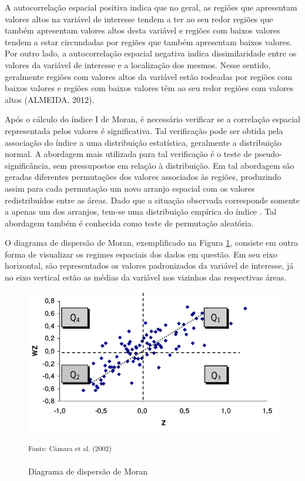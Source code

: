 \documentclass[12pt, a4paper,brazil,oneside]{article}
\begin{document}
	A autocorrelação espacial positiva indica que no geral, as regiões que apresentam valores altos na variável de interesse tendem a ter ao seu redor regiões que também apresentam valores altos desta variável e regiões com baixos valores tendem a estar circundadas por regiões que também apresentam baixos valores. Por outro lado, a autocorrelação espacial negativa indica dissimilaridade entre os valores da variável de interesse e a localização dos mesmos. Nesse sentido, geralmente regiões com valores altos da variável estão rodeadas por regiões com baixos valores e regiões com baixos valores têm ao seu redor regiões com valores altos (ALMEIDA, 2012).
	
	Após o cálculo do índice I de Moran, é necessário verificar se a correlação espacial representada pelos valores é significativa. Tal verificação pode ser obtida pela associação do índice a uma distribuição estatística, geralmente  a distribuição normal. A abordagem mais utilizada para tal verificação é o teste de pseudo-significância, sem pressupostos em relação à distribuição. Em tal abordagem são geradas diferentes permutações dos valores associados às regiões, produzindo assim para cada permutação um novo arranjo espacial com os valores redistribuídos entre as áreas. Dado que a situação observada corresponde somente a apenas um dos arranjos, tem-se uma distribuição empírica do índice \cite{camara04}. Tal abordagem também é conhecida como teste de permutação aleatória.
	
	O diagrama de dispersão de Moran, exemplificado na Figura \ref{dispersaomoran}, consiste em outra forma de visualizar os regimes espaciais dos dados em questão. Em seu eixo horizontal, são representados os valores padronizados da variável de interesse, já no eixo vertical estão as médias da variável nos vizinhos das respectivas áreas.
	
	
	\begin{figure}[H]
		\centering
		\includegraphics[scale = 0.5]{img/dispersaoMoran.png}
		\vspace{-0.4cm}
		\caption{Diagrama de dispersão de Moran}\label{dispersaomoran}
		\small \textsuperscript {Fonte: Câmara et al. (2002)}
	\end{figure}
	
\end{document}
